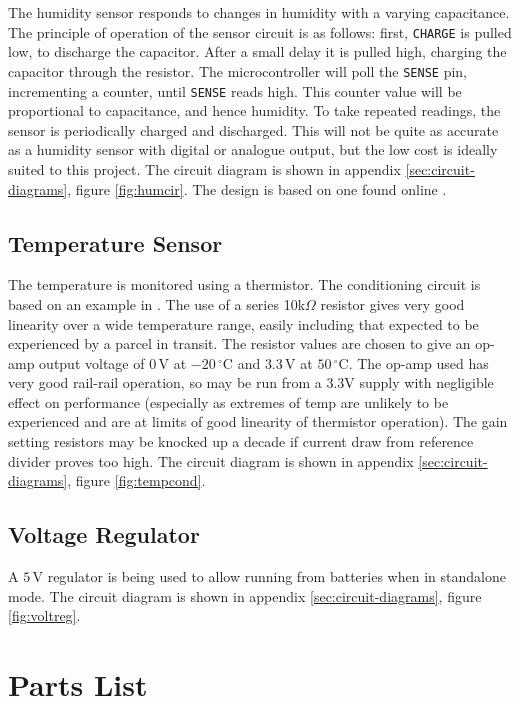 \documentclass[a4paper,11pt]{article}  %
\providecommand{\degrees}{\ensuremath{^{\circ}}}
\begin{document}
The humidity sensor responds to changes in humidity with a varying
capacitance. The principle of operation of the sensor circuit is as
follows: first, \texttt{CHARGE} is pulled low, to discharge the
capacitor. After a small delay it is pulled high, charging the
capacitor through the resistor. The microcontroller will poll the
\texttt{SENSE} pin, incrementing a counter, until \texttt{SENSE} reads
high. This counter value will be proportional to capacitance, and
hence humidity. To take repeated readings, the sensor is periodically
charged and discharged. This will not be quite as accurate as a
humidity sensor with digital or analogue output, but the low cost is
ideally suited to this project. The circuit diagram is shown in
appendix \ref{sec:circuit-diagrams}, figure \ref{fig:humcir}. The
design is based on one found online \cite{hum_sens}.

\subsection{Temperature Sensor}

The temperature is monitored using a thermistor. The conditioning
circuit is based on an example in \cite{HH}. The use of a series
10k$\Omega$ resistor gives very good linearity over a wide temperature
range, easily including that expected to be experienced by a parcel in
transit. The resistor values are chosen to give an op-amp output
voltage of $0\,\mathrm{V}$ at $-20\,\mathrm{\degrees C}$ and
$3.3\,\mathrm{V}$ at $50\,\mathrm{\degrees C}$. The op-amp used has
very good rail-rail operation, so may be run from a 3.3V supply with
negligible effect on performance (especially as extremes of temp are
unlikely to be experienced and are at limits of good linearity of
thermistor operation). The gain setting resistors may be knocked up a
decade if current draw from reference divider proves too high. The
circuit diagram is shown in appendix \ref{sec:circuit-diagrams},
figure \ref{fig:tempcond}.

\subsection{Voltage Regulator}

A $5\,\mathrm{V}$ regulator is being used to allow running from
batteries when in standalone mode. The circuit diagram is shown in
appendix \ref{sec:circuit-diagrams}, figure \ref{fig:voltreg}.

\section{Parts List}
\label{sec:parts-list}
\end{document}
